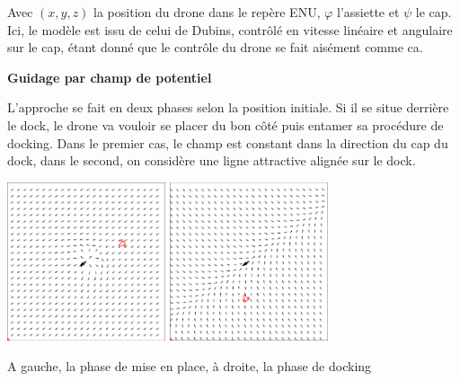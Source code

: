 \documentclass[portrait,final,a0paper,fontscale=0.3]{baposter}
\begin{document}
\begin{poster}
{	Avec $(x,y,z)$ la position du drone dans le repère ENU, $\varphi$ l'assiette et $\psi$ le cap. Ici,
	le modèle est issu de celui de Dubins, contrôlé en vitesse linéaire et angulaire sur le cap, étant
	donné que le contrôle du drone se fait aisément comme ca.


	
    
    \vspace{\baselineskip}

	\begin{center}
		\textbf{Guidage par champ de potentiel}
	\end{center}

	L'approche se fait en deux phases selon la position initiale. Si il se situe derrière le dock,
	le drone va vouloir se placer du bon côté puis entamer sa procédure de docking. Dans le premier cas,
	le champ est constant dans la direction du cap du dock, dans le second, on considère une ligne attractive
	alignée sur le dock.

	\begin{center}
		\includegraphics[width =0.35\textwidth]{imgs/ScreenshotCase2.png}
		\hfil
		\includegraphics[width =0.35\textwidth]{imgs/ScreenshotCase1.png}
	\end{center}
	\centering A gauche, la phase de mise en place, à droite, la phase de docking
}

\end{poster}
\end{document}
